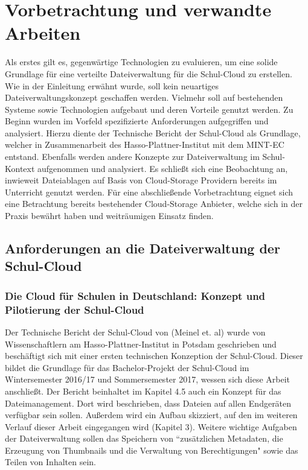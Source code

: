 \section{Vorbetrachtung und verwandte Arbeiten}
\label{sec:relatedwork}

Als erstes gilt es, gegenwärtige Technologien zu evaluieren, um eine solide Grundlage für eine verteilte Dateiverwaltung für die Schul-Cloud zu erstellen. Wie in der Einleitung erwähnt wurde, soll kein neuartiges Dateiverwaltungskonzept geschaffen werden. Vielmehr soll auf bestehenden Systeme sowie Technologien aufgebaut und deren Vorteile genutzt werden. Zu Beginn wurden im Vorfeld spezifizierte Anforderungen aufgegriffen und analysiert. Hierzu diente der Technische Bericht der Schul-Cloud \cite{paper:technischerbericht} als Grundlage, welcher in Zusammenarbeit des Hasso-Plattner-Institut mit dem MINT-EC entstand. Ebenfalls werden andere Konzepte zur Dateiverwaltung im Schul-Kontext aufgenommen und analysiert. Es schließt sich eine Beobachtung an, inwieweit Dateiablagen auf Basis von Cloud-Storage Providern bereits im Unterricht genutzt werden. Für eine abschließende Vorbetrachtung eignet sich eine Betrachtung bereits bestehender Cloud-Storage Anbieter, welche sich in der Praxis bewährt haben und weiträumigen Einsatz finden.

\subsection{Anforderungen an die Dateiverwaltung der Schul-Cloud}

\subsubsection{Die Cloud für Schulen in Deutschland: Konzept und Pilotierung der Schul-Cloud}

Der Technische Bericht der Schul-Cloud \cite{paper:technischerbericht} von (Meinel et. al) wurde von Wissenschaftlern am Hasso-Plattner-Institut in Potsdam geschrieben und beschäftigt sich mit einer ersten technischen Konzeption der Schul-Cloud. Dieser bildet die Grundlage für das Bachelor-Projekt der Schul-Cloud im Wintersemester 2016/17 und Sommersemester 2017, wessen sich diese Arbeit anschließt. Der Bericht beinhaltet im Kapitel 4.5 auch ein Konzept für das Dateimanagement. Dort wird beschrieben, dass Dateien auf allen Endgeräten verfügbar sein sollen. Außerdem wird ein Aufbau skizziert, auf den im weiteren Verlauf dieser Arbeit eingegangen wird (Kapitel 3). Weitere wichtige Aufgaben der Dateiverwaltung sollen das Speichern von ``zusätzlichen Metadaten, die Erzeugung von Thumbnails und die Verwaltung von Berechtigungen" \cite{paper:technischerbericht} sowie das Teilen von Inhalten sein.

